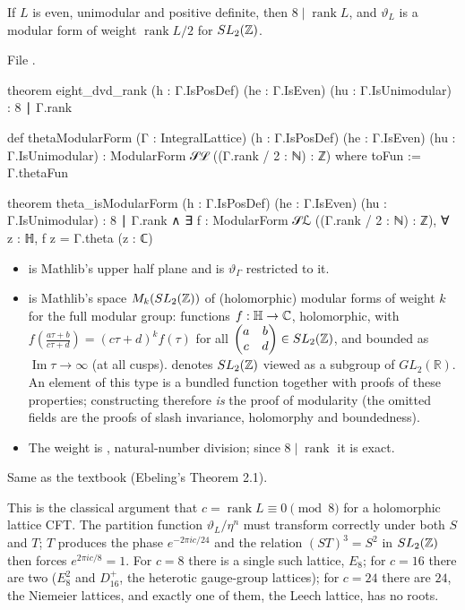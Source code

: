 \begin{theorem}\label{ch02:thm:eightdvd}
If $L$ is even, unimodular and positive definite, then $8\mid\operatorname{rank}L$, and
$\vartheta_L$ is a modular form of weight $\operatorname{rank}L/2$ for $SL_2({\mathbb{Z}})$.
\end{theorem}
\noindent File .
\begin{leancode}
theorem eight_dvd_rank (h : Γ.IsPosDef) (he : Γ.IsEven) (hu : Γ.IsUnimodular) : 8 ∣ Γ.rank

def thetaModularForm (Γ : IntegralLattice) (h : Γ.IsPosDef) (he : Γ.IsEven)
    (hu : Γ.IsUnimodular) : ModularForm 𝒮ℒ ((Γ.rank / 2 : ℕ) : ℤ) where
  toFun := Γ.thetaFun

theorem theta_isModularForm (h : Γ.IsPosDef) (he : Γ.IsEven) (hu : Γ.IsUnimodular) :
    8 ∣ Γ.rank ∧
      ∃ f : ModularForm 𝒮ℒ ((Γ.rank / 2 : ℕ) : ℤ), ∀ z : ℍ, f z = Γ.theta (z : ℂ)
\end{leancode}
\begin{dictionary}
\begin{itemize}
\item {} is Mathlib's upper half plane and  is $\vartheta_\Gamma$ restricted
  to it.
\item {} is Mathlib's space $M_k(SL_2({\mathbb{Z}}))$ of (holomorphic) modular forms of
  weight $k$ for the full modular group: functions $f:\mathbb{H}\to{\mathbb{C}}$, holomorphic, with
  $f(\frac{a\tau+b}{c\tau+d})=(c\tau+d)^kf(\tau)$ for all $\begin{pmatrix}a&b\\c&d\end{pmatrix}\in
  SL_2({\mathbb{Z}})$, and bounded as $\operatorname{Im}\tau\to\infty$ (at all cusps).   denotes
  $SL_2({\mathbb{Z}})$ viewed as a subgroup of $GL_2(\mathbb{R})$.  An element of this type is a bundled
  function together with proofs of these properties; constructing 
  therefore \emph{is} the proof of modularity (the omitted fields are the proofs of slash
  invariance, holomorphy and boundedness).
\item The weight is , natural-number division; since $8\mid\operatorname{rank}$
  it is exact.
\end{itemize}
Same as the textbook (Ebeling's Theorem 2.1).
\end{dictionary}
\begin{physics}
This is the classical argument that $c=\operatorname{rank}L\equiv0\pmod8$ for a holomorphic lattice CFT. The partition function $\vartheta_L/\eta^n$ must transform correctly under both $S$ and $T$; $T$ produces the phase $e^{-2\pi ic/24}$ and the relation $(ST)^3=S^2$ in $SL_2({\mathbb{Z}})$ then forces $e^{2\pi ic/8}=1$. For $c=8$ there is a single such lattice, $E_8$; for $c=16$ there are two ($E_8^2$ and $D_{16}^+$, the heterotic gauge-group lattices); for $c=24$ there are $24$, the Niemeier lattices, and exactly one of them, the Leech lattice, has no roots.
\end{physics}
